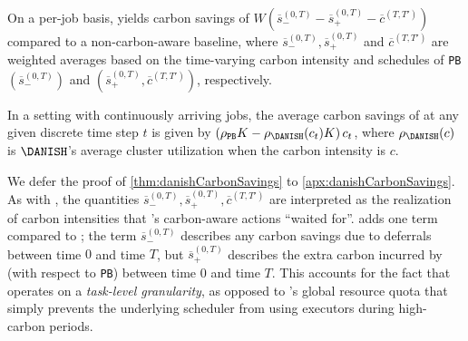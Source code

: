 \begin{thm}\label{thm:danishCarbonSavings}
   On a per-job basis, \DANISH yields carbon savings of $W \left( \overline{s}_{-}^{(0,T)} - \overline{s}_{+}^{(0,T)} - \overline{c}^{(T, T')} \right)$ compared to a non-carbon-aware baseline, where $\overline{s}_{-}^{(0,T)}, \overline{s}_{+}^{(0,T)}$ and $\overline{c}^{(T, T')}$ are weighted averages based on the time-varying carbon intensity and schedules of \texttt{PB} $(\overline{s}_{-}^{(0,T)})$ and \DANISH $(\overline{s}_{+}^{(0,T)}, \overline{c}^{(T, T')})$, respectively. %

   In a setting with continuously arriving jobs, 
   the average carbon savings of \DANISH at any given discrete time step $t$ is given by $\left(\rho_{\texttt{PB}} K - \rho_{\DANISH}(c_t) K \right) c_t$, where $\rho_{\DANISH}(c)$ is $\DANISH$'s  average cluster utilization when the carbon intensity is $c$.
\end{thm}

We defer the proof of \autoref{thm:danishCarbonSavings} to \autoref{apx:danishCarbonSavings}.  As with \CAP, the quantities $ \overline{s}_{-}^{(0,T)}, \overline{s}_{+}^{(0,T)}, \overline{c}^{(T,T')}$ are interpreted as the realization of carbon intensities that \DANISH's carbon-aware actions ``waited for''.  \DANISH adds one term compared to \CAP; the term $\overline{s}_{-}^{(0,T)}$ describes any carbon savings due to deferrals between time $0$ and time $T$, but $\overline{s}_{+}^{(0,T)}$ describes the extra carbon incurred by \DANISH (with respect to \texttt{PB}) between time $0$ and time $T$.  This accounts for the fact that \DANISH operates on a \textit{task-level granularity}, as opposed to \CAP's global resource quota that simply prevents the underlying scheduler from using executors during high-carbon periods.
